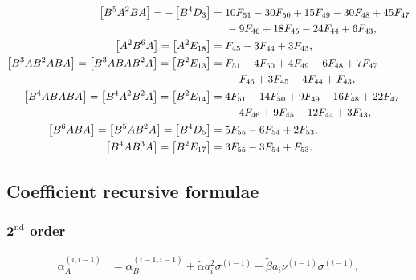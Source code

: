 \documentclass[12pt]{article}
\begin{document}
\begin{equation}
  \begin{aligned}
    \nonumber
    \left [ B^{5} A^{2} B A \right ] = - \left [ B^{4} D_{3} \right ] &= 10 F_{51} - 30 F_{50} + 15 F_{49} - 30 F_{48} + 45 F_{47} \\
    &\hspace{0.5cm} - 9 F_{46} + 18 F_{45} - 24 F_{44} + 6 F_{43}, \\
    \left [ A^{2} B^{6} A \right ] = \left [ A^{2} E_{18} \right ] &= F_{45} - 3 F_{44} + 3 F_{43}, \\
    \left [ B^{3} A B^{2} A B A \right ] = \left [ B^{3} A B A B^{2} A \right ] = \left [ B^{2} E_{13} \right ] &= F_{51} - 4 F_{50} + 4 F_{49} - 6 F_{48} + 7 F_{47} \\
    &\hspace{0.5cm} - F_{46} + 3 F_{45} - 4 F_{44} + F_{43}, \\
    \left [ B^{4} A B A B A \right ] = \left [ B^{4} A^{2} B^{2} A \right ] = \left [ B^{2} E_{14} \right ] &= 4 F_{51} - 14 F_{50} + 9 F_{49} - 16 F_{48} + 22 F_{47} \\
    &\hspace{0.5cm} - 4 F_{46} + 9 F_{45} - 12 F_{44} + 3 F_{43}, \\
    \left [ B^{6} A B A \right ] = \left [ B^{5} A B^{2} A \right ] = \left [ B^{4} D_{5} \right ] &= 5 F_{55} - 6 F_{54} + 2 F_{53}, \\
    \left [ B^{4} A B^{3} A \right ] = \left [ B^{2} E_{17} \right ] &= 3 F_{55} - 3 F_{54} + F_{53}.
  \end{aligned}
\end{equation}

\subsection*{Coefficient recursive formulae}

\subsubsection*{$\mathbf{2}^{\textrm{nd}}$ order}

\vspace{0.2cm}

\begin{equation}
  \begin{aligned}
    \alpha_{A}^{(i, i-1)} &= \alpha_{B}^{(i-1, i-1)} + \tilde{\alpha} a_{i}^{2} \sigma^{(i-1)} - \tilde{\beta} a_{i} \nu^{(i-1)} \sigma^{(i-1)},
  \end{aligned}
\end{equation}
\end{document}
